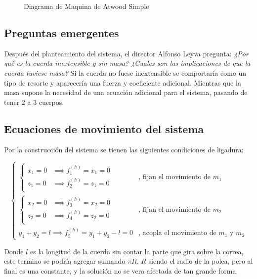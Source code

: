 \documentclass{article}
\theoremstyle{definition}
\begin{document}

\begin{figure}[htbp!]
	\caption{Diagrama de Maquina de Atwood Simple}
	\label{fig:atwood_machine}
\end{figure}

\subsection{Preguntas emergentes}
Después del planteamiento del sistema, el director Alfonso Leyva pregunta: \emph{¿Por qué es la cuerda inextensible y sin masa? ¿Cuales son las implicaciones de que la cuerda tuviese masa?} Si la cuerda no fuese inextensible se comportaría como un tipo de resorte y aparecería una fuerza y coeficiente adicional. Mientras que la masa supone la necesidad de una ecuación adicional para el sistema, pasando de tener 2 a 3 cuerpos.

\subsection{Ecuaciones de movimiento del sistema}
Por la construcción del sistema se tienen las siguientes condiciones de ligadura:

\begin{equation}
	\begin{cases}
		\begin{cases}
			x_1 = 0 &\implies f_1^{(h)} = x_1 = 0 \\
			z_1 = 0 &\implies f_2^{(h)} = z_1 = 0 \\
		\end{cases} & \text{, fijan el movimiento de } m_1 \\
		\begin{cases}
			x_2 = 0 &\implies f_3^{(h)} = x_2 = 0 \\
			z_2 = 0 &\implies f_4^{(h)} = z_2 = 0 \\
		\end{cases} & \text{, fijan el movimiento de } m_2 \\
		y_1 + y_2 = l  \implies f_5^{(h)} = y_1 + y_2 - l = 0  & \text{, acopla el movimiento de $m_1$ y $m_2$}
	\end{cases}
\end{equation}

Donde $l$ es la longitud de la cuerda sin contar la parte que gira sobre la correa, este termino se podría agregar sumando $\pi R$, $R$ siendo el radio de la polea, pero al final es una constante, y la solución no se vera afectada de tan grande forma.
\end{document}

